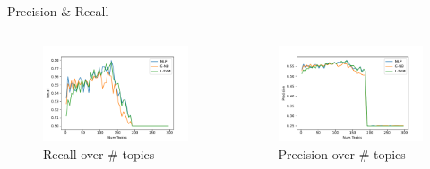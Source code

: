 \documentclass[aspectratio=169,xcolor=dvipsnames]{beamer}
\begin{document}
\begin{frame}{Precision \& Recall}
    \vspace*{-10mm}
    \begin{columns}
        \hspace{-5mm}
        \begin{column}{.7\textwidth}
            \begin{figure}
                \centering
                \includegraphics[width=.9\linewidth]{images/topic_recall.pdf}
                \caption{Recall over \# topics}
                \label{fig:rec}
            \end{figure}
        \end{column}
        \hspace*{-2cm}
       \begin{column}{.7\textwidth}
            \begin{figure}
                \centering
                \includegraphics[width=.9\linewidth]{images/topic_precision.pdf}
                \caption{Precision over \# topics}
                \label{fig:pre}
            \end{figure}
        \end{column}
    \end{columns}
\end{frame}
\end{document}

